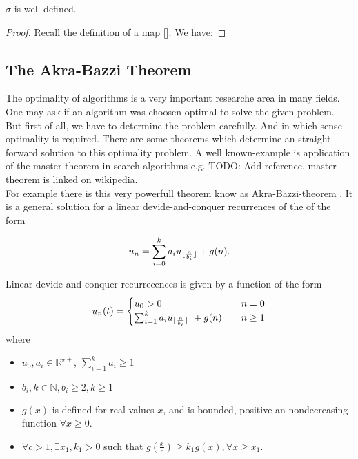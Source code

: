 \begin{lemma}
 $\sigma$ is well-defined.
\end{lemma}
\begin{proof}
Recall the definition of a map \ref{}. We have:
\end{proof}

\subsection{The Akra-Bazzi Theorem}
\label{subsection:The Akra-Bazzi Theorem}
The optimality of algorithms is a very important researche area in many fields.
One may ask if an algorithm was choosen optimal to solve the given problem.
But first of all, we have to determine the problem carefully. And in which sense optimality is required. There are some theorems which determine an straight-forward solution to this optimality problem. A well known-example is application of the master-theorem in search-algorithms e.g. \cite {}TODO: Add reference, master-theorem is linked on wikipedia.\\
For example there is this very powerfull theorem know as Akra-Bazzi-theorem \cite{AB98}.
It is a general solution for a linear devide-and-conquer recurrences of the of the form

 \begin{equation}
 \label{eq:linearDevideAndConquerRecurrence}
 u_n = \sum_{i=0}^k a_i u _{\lfloor\frac{n}{b_i}\rfloor} + g(n).
 \end{equation}
 
 Linear devide-and-conquer recurrecences is given by a function of the form\begin{equation}
 u_n(t) = 
 	\begin{cases}
			u_0 > 0 & n= 0 \\
			\sum_{i=1}^k a_i u_{\lfloor\frac{n}{b_i}\rfloor} \ + g(n) \quad &n  \geq 1 
	\end{cases}
 \end{equation}
 where
 \begin{itemize}
 \item $u_0, a_i \in \mathbb{R}^{\star+}$, $\sum_{i=1}^k a_i \geq 1$
 \item $b_{i}, k \in \mathbb{N}, b_i \geq 2, k\geq 1$
 \item $g(x)$ is defined for real values $x$, and is bounded, positive an nondecreasing function $\forall x\geq 0$.
 \item $\forall c > 1, \exists x_1, k_1 >0$ such that $g(\frac{x}{c}) \geq k_1 g(x), \forall x \geq x_1$. 
 \end{itemize}
 
